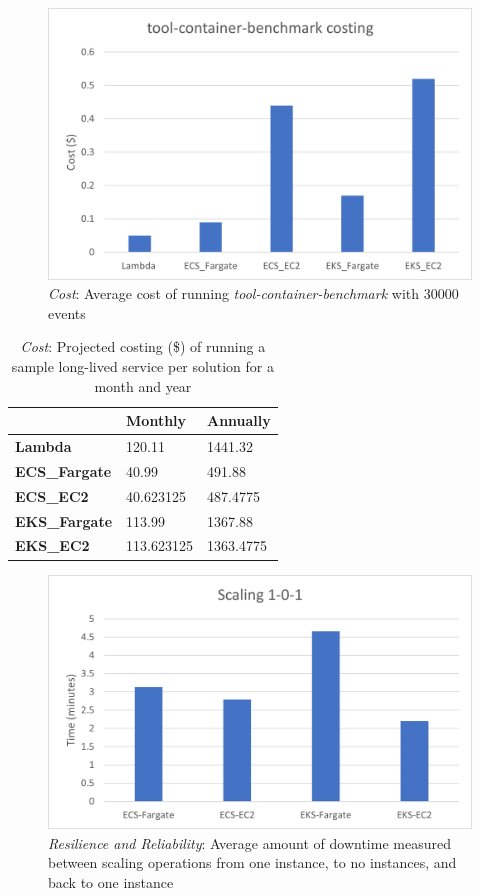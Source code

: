 \begin{figure}[hp]
  \includegraphics{images/cost-workload.png}
  \caption{\emph{Cost}: Average cost of running \emph{tool-container-benchmark} with 30000 events}
  \label{fig:cost_workload}
\end{figure}

\begin{table}[hp]
  \caption{\emph{Cost}: Projected costing (\$) of running a sample long-lived service per solution for a month and year}
  \small
  \begin{tabularx}{1\textwidth}{X | X | X }
    \space            & \bf{Monthly} & \bf{Annually} \\
    \hline
    \bf{Lambda      } & 120.11       & 1441.32       \\
    \bf{ECS\_Fargate} & 40.99        & 491.88        \\
    \bf{ECS\_EC2    } & 40.623125    & 487.4775      \\
    \bf{EKS\_Fargate} & 113.99       & 1367.88       \\
    \bf{EKS\_EC2    } & 113.623125   & 1363.4775     \\
  \end{tabularx}
  \label{fig:cost_projected}
\end{table}

\begin{figure}[hp]
  \includegraphics{images/rr-scaling.png}
  \caption{\emph{Resilience and Reliability}: Average amount of downtime measured between scaling operations from one instance, to no instances, and back to one instance}
  \label{fig:rr_scaling}
\end{figure}

